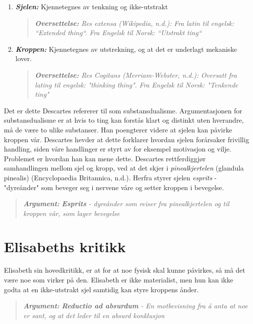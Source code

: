 \documentclass[12pt, a4paper]{article}
\newenvironment{argument}{\begin{quote}\itshape\textbf{Argument: }}{\end{quote}}
\newenvironment{oversettelse}{\begin{quote}\itshape\textbf{Oversettelse: }}{\end{quote}}
\begin{document}
\begin{enumerate}
    \item \textbf{\textit{Sjelen:}} Kjennetegnes av tenkning og ikke-utstrakt
    \begin{oversettelse}
    Res extensa (Wikipedia, n.d.): Fra latin til engelsk: ``Extended thing``. Fra Engelsk til Norsk: ``Utstrakt ting``
    \end{oversettelse}
    \item \textbf{\textit{Kroppen:}} Kjennetegnes av utstrekning, og at det er underlagt mekaniske lover.
    \begin{oversettelse}
    Res Cogitans (Merriam-Webster, n.d.): Oversatt fra lating til engelsk: "thinking thing". Fra Engelsk til Norsk: "Tenkende ting" 
    \end{oversettelse}
\end{enumerate}

Det er dette Descartes refererer til som substansdualisme. Argumentasjonen for substansdualisme er at hvis to ting kan forstås klart og distinkt uten hverandre, må de være to ulike substanser. Han poengterer videre at sjelen kan påvirke kroppen vår. Descartes hevder at dette forklarer hvordan sjelen forårsaker frivillig handling, siden våre handlinger er styrt av for eksempel motivasjon og vilje. Problemet er hvordan han kan mene dette. Descartes rettferdiggjør samhandlingen mellom sjel og kropp, ved at det skjer i \textit{pinealkjertelen} (glandula pinealis) (Encyclopaedia Britannica, n.d.). Herfra styrer sjelen \textit{esprits} - "dyreånder" som beveger seg i nervene våre og setter kroppen i bevegelse.

\begin{argument}
    \textbf{\textit{Esprits}} - dyreånder som reiser fra pinealkjertelen og til kroppen vår, som lager bevegelse
\end{argument}



\section{Elisabeths kritikk}

Elisabeth sin hovedkritikk, er at for at noe fysisk skal kunne påvirkes, så må det være noe som virker på den. Elisabeth er ikke materialist, men hun kan ikke godta at en ikke-utstrakt sjel samtidig kan styre kroppens ånder.

\begin{argument}
    \textbf{\textit{Reductio ad absurdum}} - En motbevisning fra å anta at noe er sant, og at det leder til en absurd konklusjon
\end{argument}
\end{document}
